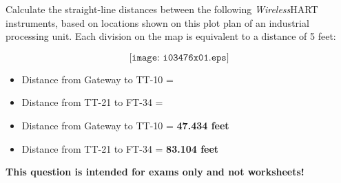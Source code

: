 

Calculate the straight-line distances between the following {\sl Wireless}HART instruments, based on locations shown on this plot plan of an industrial processing unit.  Each division on the map is equivalent to a distance of 5 feet:

$$\texttt{[image: i03476x01.eps]}$$

\begin{itemize}
\item{} Distance from Gateway to TT-10 = \underbar{\hskip 50pt} 
\vskip 10pt
\item{} Distance from TT-21 to FT-34 = \underbar{\hskip 50pt} 
\end{itemize}







\begin{itemize}
\item{} Distance from Gateway to TT-10 = {\bf 47.434 feet} 
\item{} Distance from TT-21 to FT-34 = {\bf 83.104 feet} 
\end{itemize}







{\bf This question is intended for exams only and not worksheets!}



